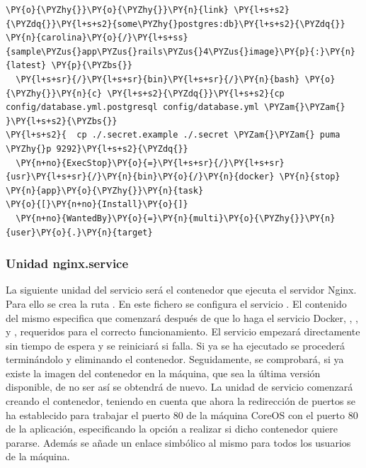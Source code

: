 \begin{codelisting}
\begin{Verbatim}[fontsize=\relsize{-2.5},fontseries=b,commandchars=\\\{\}]
  \PY{o}{\PYZhy{}}\PY{o}{\PYZhy{}}\PY{n}{link} \PY{l+s+s2}{\PYZdq{}}\PY{l+s+s2}{some\PYZhy{}postgres:db}\PY{l+s+s2}{\PYZdq{}} \PY{n}{carolina}\PY{o}{/}\PY{l+s+ss}{sample\PYZus{}app\PYZus{}rails\PYZus{}4\PYZus{}image}\PY{p}{:}\PY{n}{latest} \PY{p}{\PYZbs{}}
  \PY{l+s+sr}{/}\PY{l+s+sr}{bin}\PY{l+s+sr}{/}\PY{n}{bash} \PY{o}{\PYZhy{}}\PY{n}{c} \PY{l+s+s2}{\PYZdq{}}\PY{l+s+s2}{cp config/database.yml.postgresql config/database.yml \PYZam{}\PYZam{} }\PY{l+s+s2}{\PYZbs{}}
\PY{l+s+s2}{  cp ./.secret.example ./.secret \PYZam{}\PYZam{} puma \PYZhy{}p 9292}\PY{l+s+s2}{\PYZdq{}}
  \PY{n+no}{ExecStop}\PY{o}{=}\PY{l+s+sr}{/}\PY{l+s+sr}{usr}\PY{l+s+sr}{/}\PY{n}{bin}\PY{o}{/}\PY{n}{docker} \PY{n}{stop} \PY{n}{app}\PY{o}{\PYZhy{}}\PY{n}{task}
\PY{o}{[}\PY{n+no}{Install}\PY{o}{]} 
  \PY{n+no}{WantedBy}\PY{o}{=}\PY{n}{multi}\PY{o}{\PYZhy{}}\PY{n}{user}\PY{o}{.}\PY{n}{target}
\end{Verbatim}
\end{codelisting}

\subsubsection{Unidad nginx.service}

La siguiente unidad del servicio será el contenedor que ejecuta el servidor Nginx. Para ello se crea la ruta . En este fichero se configura el servicio . El contenido del mismo especifica que comenzará después de que lo haga el servicio Docker, , ,  y , requeridos para el correcto funcionamiento. El servicio empezará directamente sin tiempo de espera y se reiniciará si falla. Si ya se ha ejecutado se procederá terminándolo y eliminando el contenedor. Seguidamente, se comprobará, si ya existe la imagen del contenedor en la máquina, que sea la última versión disponible, de no ser así se obtendrá de nuevo. La unidad de servicio comenzará creando el contenedor, teniendo en cuenta que ahora la redirección de puertos se ha establecido para trabajar el puerto 80 de la máquina CoreOS con el puerto 80 de la aplicación, especificando la opción a realizar si dicho contenedor quiere pararse. Además se añade un enlace simbólico al mismo para todos los usuarios de la máquina. 

